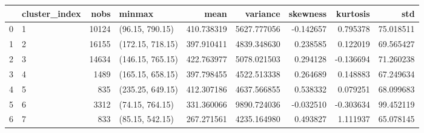 \documentclass{standalone}
\begin{document}
\begin{tabular}{llrlrrrrr}
\toprule
{} & cluster_index &   nobs &            minmax &        mean &     variance &  skewness &  kurtosis &        std \\
\midrule
0 &             1 &  10124 &   (96.15, 790.15) &  410.738319 &  5627.777056 & -0.142657 &  0.795378 &  75.018511 \\
1 &             2 &  16155 &  (172.15, 718.15) &  397.910411 &  4839.348630 &  0.238585 &  0.122019 &  69.565427 \\
2 &             3 &  14634 &  (146.15, 765.15) &  422.763977 &  5078.021503 &  0.294128 & -0.136694 &  71.260238 \\
3 &             4 &   1489 &  (165.15, 658.15) &  397.798455 &  4522.513338 &  0.264689 &  0.148883 &  67.249634 \\
4 &             5 &    835 &  (235.25, 649.15) &  412.307186 &  4637.566855 &  0.538332 &  0.079251 &  68.099683 \\
5 &             6 &   3312 &   (74.15, 764.15) &  331.360066 &  9890.724036 & -0.032510 & -0.303634 &  99.452119 \\
6 &             7 &    833 &   (85.15, 542.15) &  267.271561 &  4235.164980 &  0.493827 &  1.111937 &  65.078145 \\
\bottomrule
\end{tabular}
\end{document}
